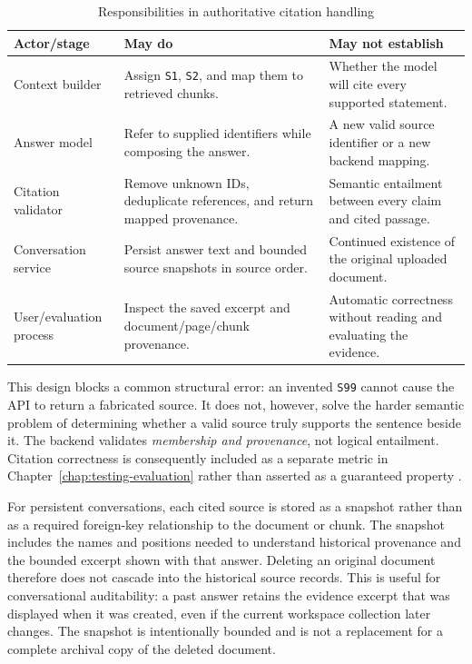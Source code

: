 \begin{table}[!htbp]
	\centering
	\caption{Responsibilities in authoritative citation handling}
	\label{tab:citation-authority}
	\small
	\begin{tabular}{@{}p{2.9cm}p{5.5cm}p{5.7cm}@{}}
		\toprule
		Actor/stage & May do & May not establish \\
		\midrule
		Context builder & Assign \texttt{S1}, \texttt{S2}, and map them to retrieved chunks. & Whether the model will cite every supported statement. \\
		Answer model & Refer to supplied identifiers while composing the answer. & A new valid source identifier or a new backend mapping. \\
		Citation validator & Remove unknown IDs, deduplicate references, and return mapped provenance. & Semantic entailment between every claim and cited passage. \\
		Conversation service & Persist answer text and bounded source snapshots in source order. & Continued existence of the original uploaded document. \\
		User/evaluation process & Inspect the saved excerpt and document/page/chunk provenance. & Automatic correctness without reading and evaluating the evidence. \\
		\bottomrule
	\end{tabular}
\end{table}

This design blocks a common structural error: an invented \texttt{S99} cannot cause the API to return a fabricated source. It does not, however, solve the harder semantic problem of determining whether a valid source truly supports the sentence beside it. The backend validates \emph{membership and provenance}, not logical entailment. Citation correctness is consequently included as a separate metric in Chapter~\ref{chap:testing-evaluation} rather than asserted as a guaranteed property \cite{Liu2023Verifiability}.

For persistent conversations, each cited source is stored as a snapshot rather than as a required foreign-key relationship to the document or chunk. The snapshot includes the names and positions needed to understand historical provenance and the bounded excerpt shown with that answer. Deleting an original document therefore does not cascade into the historical source records. This is useful for conversational auditability: a past answer retains the evidence excerpt that was displayed when it was created, even if the current workspace collection later changes. The snapshot is intentionally bounded and is not a replacement for a complete archival copy of the deleted document.

